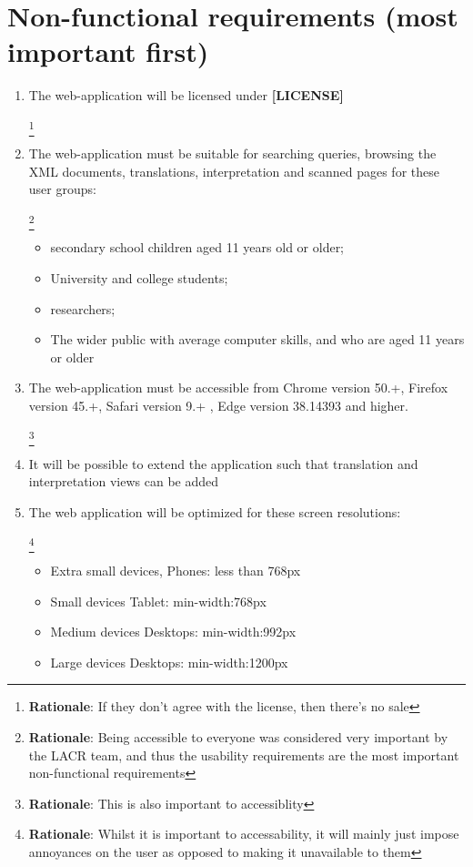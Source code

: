 \documentclass[10pt,a4paper]{report}
\newcommand{\rationale}[1]{
    \footnote{
        \textbf{Rationale}: #1
    }
}
\begin{document}
    \section*{Non-functional requirements (most important first)}
        \begin{enumerate}
            \item The web-application will be licensed under \textbf{[LICENSE]}
            \rationale{If they don't agree with the license, then there's no sale}
            
            \item The web-application must be suitable for searching queries, browsing the XML documents, translations, interpretation and scanned pages for these user groups:
            \rationale{Being accessible to everyone was considered very important by the LACR team, and thus the usability requirements are the most important non-functional requirements}
            \begin{itemize}
                \item secondary school children aged 11 years old or older;
                \item University and college students;
                \item researchers;
                \item The wider public with average computer skills, and who are aged 11 years or older
            \end{itemize}
            
            \item The web-application must be accessible from Chrome version 50.+, Firefox version 45.+, Safari version 9.+ , Edge version 38.14393 and higher.
            \rationale{This is also important to accessiblity}
            
            \item It will be possible to extend the application such that translation and interpretation views can be added
            
            \item The web application will be optimized for these screen resolutions:
            \rationale{Whilst it is important to accessability, it will mainly just impose annoyances on the user as opposed to making it unavailable to them}
            \begin{itemize}
                \item Extra small devices, Phones: less than 768px
                \item Small devices Tablet: min-width:768px
                \item Medium devices Desktops: min-width:992px
                \item Large devices Desktops: min-width:1200px
            \end{itemize}
            

\end{enumerate}
\end{document}
